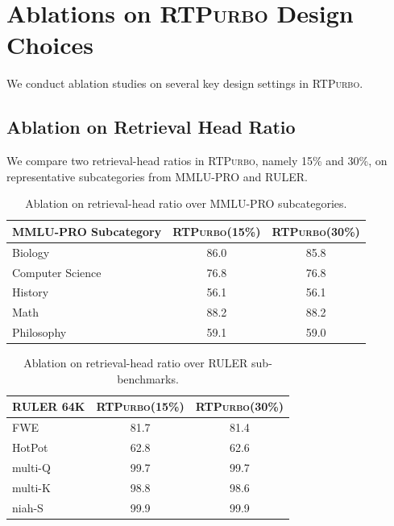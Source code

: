\documentclass{llmxive}
\providecommand{\name}{{\textsc{RTPurbo}}\xspace}
\begin{document}
\section{Ablations on \name Design Choices}
\label{appd:ablation}

We conduct ablation studies on several key design settings in \name.

\subsection{Ablation on Retrieval Head Ratio}

We compare two retrieval-head ratios in \name, namely 15\% and 30\%, on representative subcategories from MMLU-PRO and RULER.

\begin{table}[ht]
    \centering
    \small
    \begin{tabular}{lcc}
        \toprule
        \textbf{MMLU-PRO Subcategory} & \textbf{\name (15\%)} & \textbf{\name (30\%)} \\
        \midrule
        Biology & 86.0 & 85.8 \\
        Computer Science & 76.8 & 76.8 \\
        History & 56.1 & 56.1 \\
        Math & 88.2 & 88.2 \\
        Philosophy & 59.1 & 59.0 \\
        \bottomrule
    \end{tabular}
\caption{Ablation on retrieval-head ratio over MMLU-PRO subcategories.}
\label{tab:appendix_mmlupro_ratio}
\end{table}

\begin{table}[ht]
    \centering
    \small
    \begin{tabular}{lcc}
        \toprule
        \textbf{RULER 64K} & \textbf{\name (15\%)} & \textbf{\name (30\%)} \\
        \midrule
        FWE & 81.7 & 81.4 \\
        HotPot & 62.8 & 62.6 \\
        multi-Q & 99.7 & 99.7 \\
        multi-K & 98.8 & 98.6 \\
        niah-S & 99.9 & 99.9 \\
        \bottomrule
    \end{tabular}
\caption{Ablation on retrieval-head ratio over RULER sub-benchmarks.}
\label{tab:appendix_ruler_ratio}
\end{table}
\end{document}
